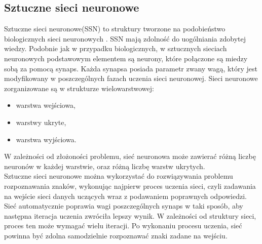 \subsection{Sztuczne sieci neuronowe}
Sztuczne sieci neuronowe(SSN) to struktury tworzone na podobieństwo biologicznych sieci neuronowych \cite{tadeusiewicz93}. SSN mają zdolność do uogólniania zdobytej wiedzy. Podobnie jak w przypadku biologicznych, w sztucznych sieciach neuronowych podstawowym elementem są neurony, które połączone są miedzy sobą za pomocą synaps. Każda synapsa posiada parametr zwany wagą, który jest modyfikowany w poszczególnych fazach uczenia sieci neuronowej. Sieci neuronowe zorganizowane są w strukturze wielowarstwowej:
\begin{itemize}
  \item warstwa wejściowa,
  \item warstwy ukryte,
  \item warstwa wyjściowa.
\end{itemize}
W zależności od złożoności problemu, sieć neuronowa może zawierać różną liczbę neuronów w każdej warstwie, oraz różną liczbę warstw ukrytych. \\
Sztuczne sieci neuronowe można wykorzystać do rozwiązywania problemu rozpoznawania znaków, wykonując najpierw proces uczenia sieci, czyli zadawania na wejście sieci danych uczących wraz z podawaniem poprawnych odpowiedzi. Sieć automatycznie poprawia wagi poszczególnych synaps w taki sposób, aby następna iteracja uczenia zwróciła lepszy wynik. W zależności od struktury sieci, proces ten może wymagać wielu iteracji. Po wykonaniu procesu uczenia, sieć powinna być zdolna samodzielnie rozpoznawać znaki zadane na wejściu.

